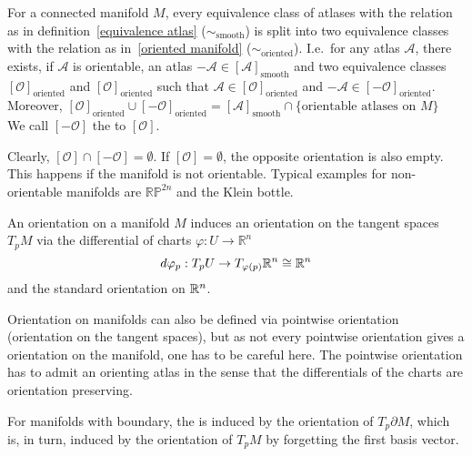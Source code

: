 \documentclass[a4paper,11pt]{article}
\begin{document}
\begin{observation}
    For a connected manifold \(M\), every equivalence class of atlases with the relation as in definition\ \ref{equivalence atlas} (\(\sim_{\text{smooth}}\)) is split into two equivalence classes with the relation as in\ \ref{oriented manifold} (\(\sim_{\text{oriented}}\)). 
    I.e.\ for any atlas \(\mathcal{A}\), there exists, 
    if \(\mathcal{A}\) is orientable, 
    an atlas \(-\mathcal{A}\in[\mathcal{A}]_{\text{smooth}}\) and two equivalence classes 
    \([\mathcal{O}]_\text{oriented}\) and \([\mathcal{O}]_{\text{oriented}}\) such that 
    \(\mathcal{A}\in[\mathcal{O}]_\text{oriented}\) and \(-\mathcal{A}\in[-\mathcal{O}]_\text{oriented}\). \\
    Moreover, \([\mathcal{O}]_\text{oriented}\cup[-\mathcal{O}]_\text{oriented}=[\mathcal{A}]_\text{smooth}\cap\{\text{orientable atlases on }M\}\)\\
    We call \([-\mathcal{O}]\) the  to \([\mathcal{O}]\).
\end{observation}

\begin{remark}
    Clearly, \([\mathcal{O}]\cap[-\mathcal{O}]=\emptyset\). If \([\mathcal{O}]=\emptyset\), the opposite orientation is also empty. This happens if the manifold is not orientable. Typical examples for non-orientable manifolds are \(\mathbb{RP}^{2n}\) and the Klein bottle.
\end{remark}

An orientation on a manifold \(M\) induces an orientation on the tangent spaces \(T_p M\) via the differential of charts \(\varphi:U\to\mathbb{R}^n\)
\[d\varphi_p:T_p U\to T_{\varphi(p)}\mathbb{R}^n\cong\mathbb{R}^n\]
and the standard orientation on \(\mathbb{R}^n\).

\begin{remark}
    Orientation on manifolds can also be defined via pointwise orientation (orientation on the tangent spaces), but as not every pointwise orientation gives a orientation on the manifold, one has to be careful here. The pointwise orientation has to admit an orienting atlas in the sense that the differentials of the charts are orientation preserving.
\end{remark}

For manifolds with boundary, the  is induced by the orientation of \(T_p\partial M\), which is, in turn, induced by the orientation of \(T_p M\) by forgetting the first basis vector.

\end{document}
